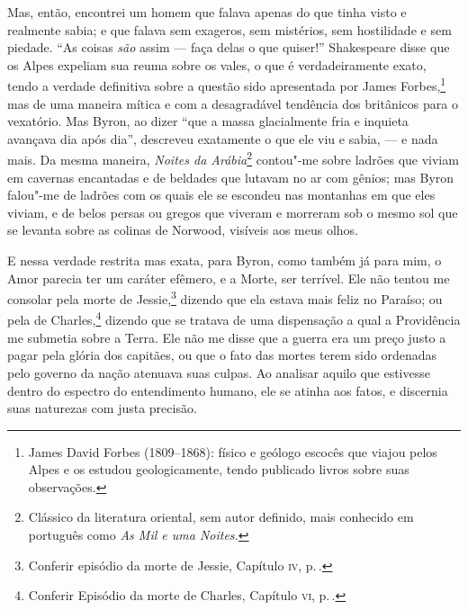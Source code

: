 Mas, então, encontrei um homem que falava apenas do que tinha visto
e realmente sabia; e que falava sem exageros, sem mistérios, sem
hostilidade e sem piedade. ``As coisas \textit{são} assim --- faça delas o
que quiser!'' Shakespeare disse que os Alpes expeliam sua reuma sobre os
vales, o que é verdadeiramente exato, tendo a verdade definitiva sobre a
questão sido apresentada por James Forbes,\footnote{James David Forbes
  (1809--1868): físico e geólogo escocês que viajou pelos Alpes e os
  estudou geologicamente, tendo publicado livros sobre suas observações.} mas de uma maneira mítica e com a desagradável
tendência dos britânicos para o vexatório. Mas Byron, ao dizer ``que a
massa glacialmente fria e inquieta avançava dia após dia'', descreveu
exatamente o que ele viu e sabia, --- e nada mais. Da mesma maneira,
\textit{Noites da Arábia}\footnote{Clássico da literatura oriental, sem
  autor definido, mais conhecido em português como \textit{As Mil e uma
  Noites.}} contou"-me sobre ladrões que viviam em
cavernas encantadas e de beldades que lutavam no ar com gênios; mas
Byron falou"-me de ladrões com os quais ele se escondeu nas montanhas em
que eles viviam, e de belos persas ou gregos que viveram e morreram sob
o mesmo sol que se levanta sobre as colinas de Norwood, visíveis aos
meus olhos.

E nessa verdade restrita mas exata, para Byron, como também já para mim,
o Amor parecia ter um caráter efêmero, e a Morte, ser terrível. Ele não
tentou me consolar pela morte de Jessie,\footnote{Conferir episódio da
  morte de Jessie, Capítulo \textsc{iv}, p.\,\pageref{jessie}.} dizendo que ela
estava mais feliz no Paraíso; ou pela de Charles,\footnote{Conferir
  Episódio da morte de Charles, Capítulo \textsc{vi}, p.\,\pageref{157}.}
dizendo que se tratava de uma dispensação a qual a Providência me
submetia sobre a Terra. Ele não me disse que a guerra era um preço justo
a pagar pela glória dos capitães, ou que o fato das mortes terem sido
ordenadas pelo governo da nação atenuava suas culpas. Ao analisar aquilo
que estivesse dentro do espectro do entendimento humano, ele se atinha
aos fatos, e discernia suas naturezas com justa precisão.

